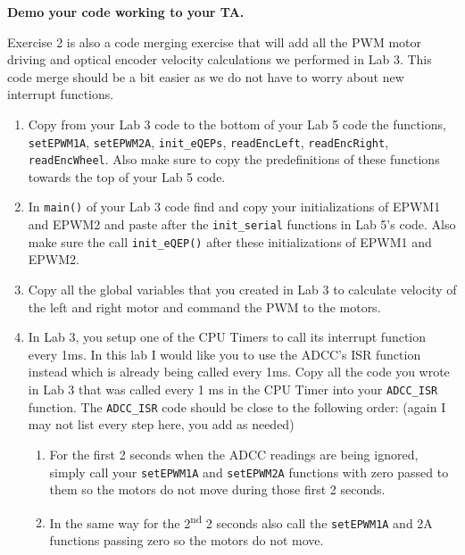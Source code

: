 \documentclass[11pt]{article}
\begin{document}
%
\begin{checkoff}
        \textbf{Demo your code working to your TA.}
\end{checkoff}
%

Exercise 2 is also a code merging exercise that will add all the PWM motor driving and optical encoder velocity calculations we performed in Lab 3. This code merge should be a bit easier as we do not have to worry about new interrupt functions.
%
\begin{enumerate}
        \item Copy from your Lab 3 code to the bottom of your Lab 5 code the functions, \texttt{setEPWM1A}, \texttt{setEPWM2A}, \texttt{init_eQEPs}, \texttt{readEncLeft}, \texttt{readEncRight}, \texttt{readEncWheel}. Also make sure to copy the predefinitions of these functions towards the top of your Lab 5 code.
        \item In \texttt{main()} of your Lab 3 code find and copy your initializations of EPWM1 and EPWM2 and paste after the \texttt{init_serial} functions in Lab 5’s code. Also make sure the call \texttt{init_eQEP()} after these initializations of EPWM1 and EPWM2.
    \item Copy all the global variables that you created in Lab 3 to calculate velocity of the left and right motor and command the PWM to the motors.
        \item In Lab 3, you setup one of the CPU Timers to call its interrupt function every 1ms. In this lab I would like you to use the ADCC’s ISR function instead which is already being called every 1ms. Copy all the code you wrote in Lab 3 that was called every 1 ms in the CPU Timer into your \texttt{ADCC_ISR} function. The \texttt{ADCC_ISR} code should be close to the following order: (again I may not list every step here, you add as needed)
        \begin{enumerate}
                \item For the first 2 seconds when the ADCC readings are being ignored, simply call your \texttt{setEPWM1A} and \texttt{setEPWM2A} functions with zero passed to them so the motors do not move during those first 2 seconds.
                \item In the same way for the 2\textsuperscript{nd} 2 seconds also call the \texttt{setEPWM1A} and 2A functions passing zero so the motors do not move.

\end{enumerate}
\end{enumerate}
\end{document}
